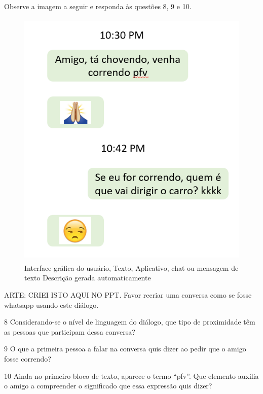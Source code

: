 {Observe a imagem a seguir e responda às questões 8, 9 e 10.

\begin{figure}
\centering
\includegraphics[width=4.52539in,height=4.97543in]{./imgSAEB_6_POR/media/image33.png}
\caption{Interface gráfica do usuário, Texto, Aplicativo, chat ou
mensagem de texto Descrição gerada automaticamente}
\end{figure}

ARTE: CRIEI ISTO AQUI NO PPT. Favor recriar uma conversa como se fosse
whatsapp usando este diálogo.

\num{8} Considerando-se o nível de linguagem do diálogo, que tipo de
proximidade têm as pessoas que participam dessa conversa?



\num{9} O que a primeira pessoa a falar na conversa quis dizer ao pedir
que o amigo fosse correndo?



\num{10} Ainda no primeiro bloco de texto, aparece o termo ``pfv''. Que
elemento auxilia o amigo a compreender o significado que essa expressão
quis dizer?

}
